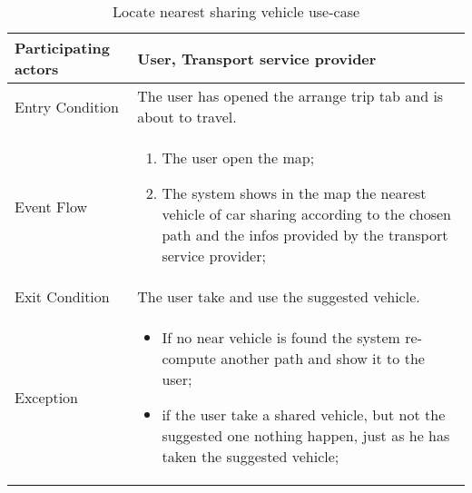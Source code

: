 \begin{table}[H]
	\begin{center}
		\begin{tabular}{ | p{} | p{} | }
		\hline
		Participating actors &  User, Transport service provider\\
		\hline
		Entry Condition & The user has opened the arrange trip tab and is about to travel.\\
		\hline
		Event Flow & 
			\begin{enumerate}
				\item The user open the map;
				\item The system shows in the map the nearest vehicle of car sharing according to the chosen path and the infos provided by the transport service provider;
			\end{enumerate} \\
		\hline
		Exit Condition & The user take and use the suggested vehicle. \\
		\hline
		Exception &
				\begin{itemize}
   					\item If no near vehicle is found the system re-compute another path and show it to the user;
   					\item if the user take a shared vehicle, but not the suggested one nothing happen, just as he has taken the suggested vehicle;
   				\end{itemize} \\ 
		\hline
		\end{tabular}
	\end{center}
	\caption{Locate nearest sharing vehicle use-case}
\end{table}